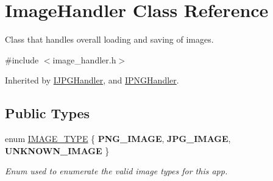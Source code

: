 \hypertarget{classImageHandler}{}\section{Image\+Handler Class Reference}
\label{classImageHandler}


Class that handles overall loading and saving of images.  




{\ttfamily \#include $<$image\+\_\+handler.\+h$>$}



Inherited by \hyperlink{classIJPGHandler}{I\+J\+P\+G\+Handler}, and \hyperlink{classIPNGHandler}{I\+P\+N\+G\+Handler}.

\subsection*{Public Types}
\begin{DoxyCompactItemize}
\item 
enum \hyperlink{classImageHandler_ade489694bd1fd4a2200e93f39d0efe83}{I\+M\+A\+G\+E\+\_\+\+T\+Y\+PE} \{ {\bfseries P\+N\+G\+\_\+\+I\+M\+A\+GE}, 
{\bfseries J\+P\+G\+\_\+\+I\+M\+A\+GE}, 
{\bfseries U\+N\+K\+N\+O\+W\+N\+\_\+\+I\+M\+A\+GE}
 \}\hypertarget{classImageHandler_ade489694bd1fd4a2200e93f39d0efe83}{}\label{classImageHandler_ade489694bd1fd4a2200e93f39d0efe83}
\begin{DoxyCompactList}\small\item\em Enum used to enumerate the valid image types for this app. \end{DoxyCompactList}
\end{DoxyCompactItemize}
